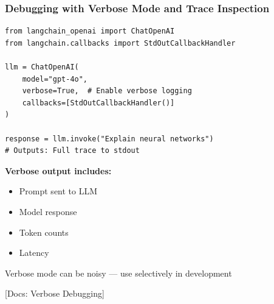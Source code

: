 \documentclass[aspectratio=169,11pt]{beamer}
\newcommand{\docref}[1]{{\scriptsize\color{docgray}[Docs: #1]}}
\begin{document}
\begin{frame}[fragile]
  \frametitle{Debugging with Verbose Mode and Trace Inspection}

  \begin{lstlisting}
from langchain_openai import ChatOpenAI
from langchain.callbacks import StdOutCallbackHandler

llm = ChatOpenAI(
    model="gpt-4o",
    verbose=True,  # Enable verbose logging
    callbacks=[StdOutCallbackHandler()]
)

response = llm.invoke("Explain neural networks")
# Outputs: Full trace to stdout
  \end{lstlisting}

  \vspace{0.1cm}

  \textbf{Verbose output includes:}
  \begin{itemize}
    \setlength{\itemsep}{1pt}
    \item Prompt sent to LLM
    \item Model response
    \item Token counts
    \item Latency
  \end{itemize}

  \vspace{0.1cm}

  \begin{warningbox}[Caution]
    Verbose mode can be noisy — use selectively in development
  \end{warningbox}

  \docref{Verbose Debugging}
\end{frame}

\end{document}
